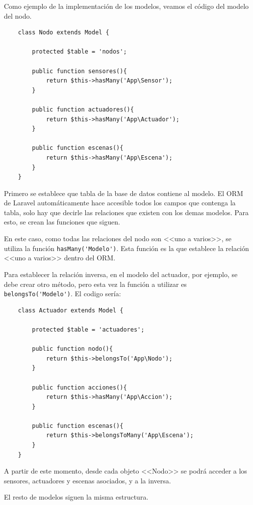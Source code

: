     Como ejemplo de la implementación de los modelos, veamos el código del modelo del nodo.
    
    \begin{lstlisting}
    class Nodo extends Model {
    
        protected $table = 'nodos';
    
        public function sensores(){
            return $this->hasMany('App\Sensor');
        }
    
        public function actuadores(){
            return $this->hasMany('App\Actuador');
        }
    
        public function escenas(){
            return $this->hasMany('App\Escena');
        }
    }
    \end{lstlisting}
    
    Primero se establece que tabla de la base de datos contiene al modelo. El ORM de Laravel automáticamente hace accesible todos los campos que contenga la tabla, solo hay que decirle las relaciones que existen con los demas modelos. Para esto, se crean las funciones que siguen.
    
    En este caso, como todas las relaciones del nodo son <<uno a varios>>, se utiliza la función \lstinline|hasMany('Modelo')|. Esta función es la que establece la relación <<uno a varios>> dentro del ORM.
    
    Para establecer la relación inversa, en el modelo del actuador, por ejemplo, se debe crear otro método, pero esta vez la función a utilizar es \lstinline|belongsTo('Modelo')|. El codigo sería:
    \begin{lstlisting}
    class Actuador extends Model {
    
        protected $table = 'actuadores';
        
        public function nodo(){
            return $this->belongsTo('App\Nodo');
        }
        
        public function acciones(){
            return $this->hasMany('App\Accion');
        }
        
        public function escenas(){
            return $this->belongsToMany('App\Escena');
        }
    }
    \end{lstlisting}
    
    A partir de este momento, desde cada objeto <<Nodo>> se podrá acceder a los sensores, actuadores y escenas asociados, y  a la inversa.
    
    El resto de modelos siguen la misma estructura.
    
